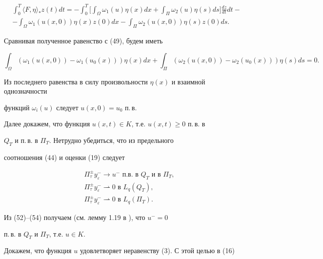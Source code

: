 \begin{gather*} 


\int^T_0\langle F,\eta\rangle_* z(t) dt =-\int^T_0 


\biggl [\int_\Omega \omega_1(u)\eta(x)dx + 


\int_\Pi \omega_2(u)\eta(s)ds\biggr ]\frac{dz}{dt}dt -\\ 


-\int_\Omega \omega_1(u(x,0))\eta(x)z(0)dx - 


\int_\Pi \omega_2(u(x,0))\eta(s)z(0)ds. 


\end{gather*} 


Сравнивая полученное равенство с (49), будем иметь 


$$ 


\int_\Omega (\omega_1(u(x,0))-\omega_1(u_0(x)))\eta(x)dx + 


\int_\Pi (\omega_2(u(x,0))-\omega_2(u_0(x)))\eta(s)ds =0. 


$$ 


Из последнего равенства в силу произвольности $\eta(x)$ и взаимной однозначности 


функций $\omega_i(u)$ следует $u(x,0)=u_0$ п.\,в.


 


Далее докажем, что функция $u(x,t)\in K$, т.е. $u(x,t)\ge 0$ п.\,в. в 


$Q_T$ и п.\,в. в $\Pi_T$. Нетрудно убедиться, что из предельного 


соотношения (44) и оценки (19) следует 


\begin{align} 


&\Pi^\pm_\tau y^-_\varepsilon \to u^- \text{ п.в. в }Q_T \text{ и в }\Pi_T,\\ 


&\Pi^\pm_\tau y^-_\varepsilon \rightharpoonup 0 \text { в } L_q(Q_T),\\ 


&\Pi^\pm_\tau y^-_\varepsilon \rightharpoonup 0 \text { в } L_q(\Pi_T). 


\end{align} 


Из (52)--(54) получаем (см. лемму 1.19 в \cite{Gae}), что $u^-=0$ 


п.\,в. в $Q_T$ и $\Pi_T$, т.е. $u\in K.$


 


Докажем, что функция $u$ удовлетворяет неравенству (3). С этой целью в (16) 


